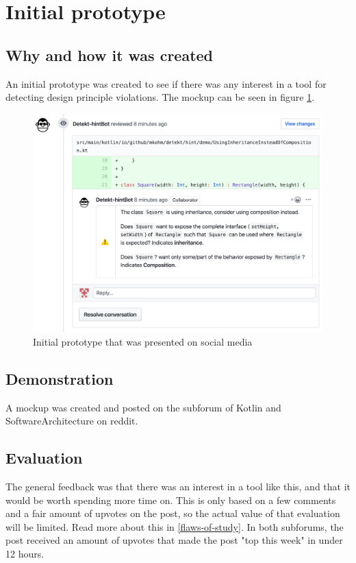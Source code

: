 \documentclass{report}
\begin{document}
\section{Initial prototype}

\subsection*{Why and how it was created}
An initial prototype was created to see if there was any interest in a tool for detecting design principle violations. The mockup can be seen in figure \ref{fig:mockup}.

\begin{figure}[h!]
    \centering
    \includegraphics[width=\textwidth]{../images/demo.png}
    \caption{Initial prototype that was presented on social media}
    \label{fig:mockup}
\end{figure}

\subsection*{Demonstration}
A mockup was created and posted on the subforum of Kotlin\cite{kotlin-reddit} and SoftwareArchitecture\cite{softwarearch-reddit} on reddit. 

\subsection*{Evaluation}
The general feedback was that there was an interest in a tool like this, and that it would be worth spending more time on. This is only based on a few comments and a fair amount of upvotes on the post, so the actual value of that evaluation will be limited. Read more about this in \ref{flaws-of-study}. In both subforums, the post received an amount of upvotes that made the post "top this week" in under 12 hours. \\
\end{document}
